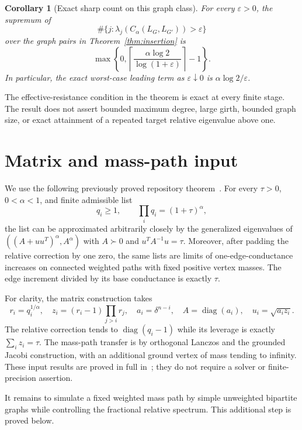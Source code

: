 \documentclass[11pt]{article}
\newtheorem{corollary}[theorem]{Corollary}
\newcommand{\diag}{\operatorname{diag}}
\begin{document}
\begin{corollary}[Exact sharp count on this graph class]
\label{cor:count}
For every $\varepsilon>0$, the supremum of
\[
 \#\{j:\lambda_j(C_\alpha(L_G,L_{G'}))>\varepsilon\}
\]
over the graph pairs in Theorem~\ref{thm:insertion} is
\[
 \max\left\{0,\left\lceil
      \frac{\alpha\log2}{\log(1+\varepsilon)}
                         \right\rceil-1\right\}.
\]
In particular, the exact worst-case leading term as
$\varepsilon\downarrow0$ is $\alpha\log2/\varepsilon$.
\end{corollary}

The effective-resistance condition in the theorem is exact at every
finite stage. The result does not assert bounded maximum degree, large
girth, bounded graph size, or exact attainment of a repeated target
relative eigenvalue above one.

\section{Matrix and mass-path input}
We use the following previously proved repository theorem~\cite{Relative}.
For every $\tau>0$, $0<\alpha<1$, and finite admissible list
\[
 q_i\ge1,\qquad \prod_iq_i=(1+\tau)^\alpha,
\]
the list can be approximated arbitrarily closely by the generalized
eigenvalues of $((A+uu^T)^\alpha,A^\alpha)$ with $A\succ0$ and
$u^TA^{-1}u=\tau$. Moreover, after padding the relative correction
by one zero, the same lists are limits of one-edge-conductance increases
on connected weighted paths with fixed positive vertex masses.
The edge increment divided by its base conductance is exactly $\tau$.

For clarity, the matrix construction takes
\[
 r_i=q_i^{1/\alpha},\quad
 z_i=(r_i-1)\prod_{j>i}r_j,\quad
 a_i=\delta^{n-i},\quad A=\diag(a_i),\quad u_i=\sqrt{a_i z_i}.
\]
The relative correction tends to $\diag(q_i-1)$ while its leverage is
exactly $\sum_i z_i=\tau$. The mass-path transfer is by orthogonal
Lanczos and the grounded Jacobi construction, with an additional
ground vertex of mass tending to infinity. These input results are
proved in full in~\cite{Relative}; they do not require a solver or
finite-precision assertion.

It remains to simulate a fixed weighted mass path by simple unweighted
bipartite graphs while controlling the fractional relative spectrum.
This additional step is proved below.
\end{document}
